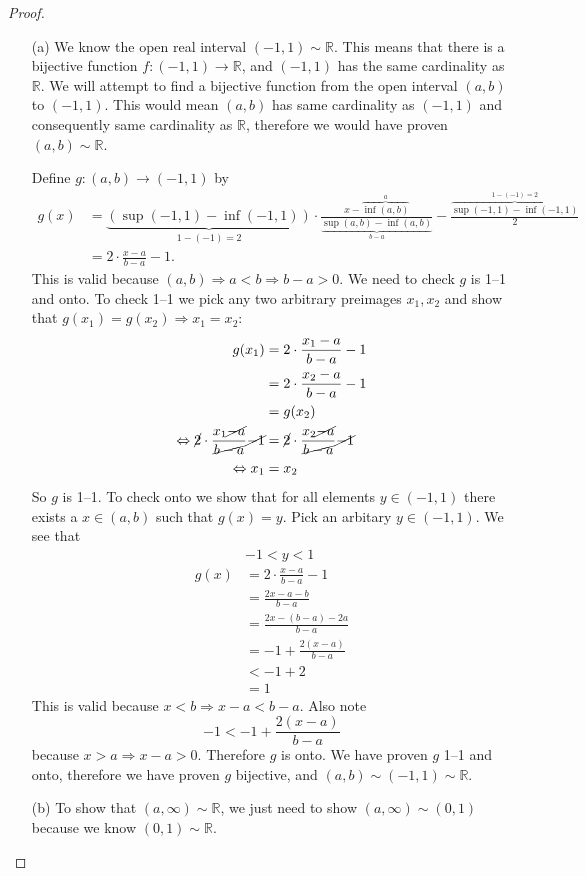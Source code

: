 \documentclass[11pt,twoside, reqno]{amsart}
\theoremstyle{remark}
\def\R{\mathbb R}
\renewcommand{\implies}{\Rightarrow}
\renewcommand{\iff}{\Leftrightarrow}
\begin{document}
\begin{proof}\;
\begin{enumerate}
\item[(a)] We know the open real interval $(-1,1) \sim \R$. This means that there is a bijective function $f:(-1,1) \to \R$, and $(-1,1)$ has the same cardinality as $\R$. We will attempt to find a bijective function from the open interval $(a,b)$ to $(-1,1)$. This would mean $(a,b)$ has same cardinality as $(-1,1)$ and consequently same cardinality as $\R$, therefore we would have proven $(a,b) \sim \R$.

Define $g:(a,b) \to (-1,1)$ by
\begin{align*}
g(x) &= \underbrace{(\sup (-1,1) - \inf (-1,1))}_{1-(-1) = 2} \cdot \frac{x - \overbrace{\inf (a,b)}^{a}}{\underbrace{\sup (a,b) - \inf (a,b)}_{b-a}} - \frac{\overbrace{\sup (-1,1) - \inf (-1,1)}^{1-(-1)=2}}{2} \\
&=2 \cdot \frac{x-a}{b-a} - 1.
\end{align*}
This is valid because $(a,b) \implies a < b \implies b - a > 0$. We need to check $g$ is 1--1 and onto. To check 1--1 we pick any two arbitrary preimages $x_1, x_2$ and show that $g(x_1) = g(x_2) \implies x_1 = x_2$: 
\begin{align*}
    g(x_1) &= 2 \cdot \frac{x_1 - a}{b-a} - 1 \\
    &= 2 \cdot \frac{x_2 - a}{b-a} - 1 \\
    &= g(x_2) \\ 
    \iff \cancel{2} \cdot \frac{x_1 \cancel{- a}}{\cancel{b-a}} \cancel{- 1} &= \cancel{2} \cdot \frac{x_2 \cancel{- a}}{\cancel{b-a}} \cancel{- 1} \\
    \iff x_1 &= x_2
\end{align*}
So $g$ is 1--1. To check onto we show that for all elements $y \in (-1,1)$ there exists a $x \in (a,b)$ such that $g(x) = y$. Pick an arbitary $y \in (-1,1)$. We see that
\begin{align*}
& -1 < y < 1 \\
g(x) &= 2 \cdot \frac{x - a}{b-a} - 1 \\
&= \frac{2x- a - b}{b-a}\\
&= \frac{2x -(b-a) -2a}{b-a}\\
&= -1 + \frac{2(x-a)}{b-a}\\
&< -1 + 2\\
&= 1
\end{align*}
This is valid because $x < b \implies x-a < b-a$. Also note
$$
-1 < -1 + \frac{2(x-a)}{b-a}
$$
because $x > a \implies x - a > 0$. Therefore $g$ is onto. We have proven $g$ 1--1 and onto, therefore we have proven $g$ bijective, and $(a,b) \sim (-1,1) \sim \R$.
\item[(b)] To show that $(a,\infty) \sim \R$, we just need to show $(a,\infty) \sim (0,1)$ because we know $(0,1) \sim \R$.


\end{enumerate}
\end{proof}
\end{document}
